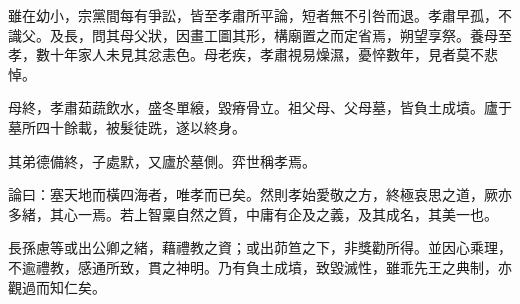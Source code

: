 \begin{pinyinscope}
 雖在幼小，宗黨間每有爭訟，皆至孝肅所平論，短者無不引咎而退。孝肅早孤，不識父。及長，問其母父狀，因畫工圖其形，構廟置之而定省焉，朔望享祭。養母至孝，數十年家人未見其忿恚色。母老疾，孝肅視易燥濕，憂悴數年，見者莫不悲悼。



 母終，孝肅茹蔬飲水，盛冬單縗，毀瘠骨立。祖父母、父母墓，皆負土成墳。廬于墓所四十餘載，被髮徒跣，遂以終身。



 其弟德備終，子處默，又廬於墓側。弈世稱孝焉。



 論曰：塞天地而橫四海者，唯孝而已矣。然則孝始愛敬之方，終極哀思之道，厥亦多緒，其心一焉。若上智稟自然之質，中庸有企及之義，及其成名，其美一也。



 長孫慮等或出公卿之緒，藉禮教之資；或出茆笪之下，非獎勸所得。並因心乘理，不逾禮教，感通所致，貫之神明。乃有負土成墳，致毀滅性，雖乖先王之典制，亦觀過而知仁矣。



\end{pinyinscope}